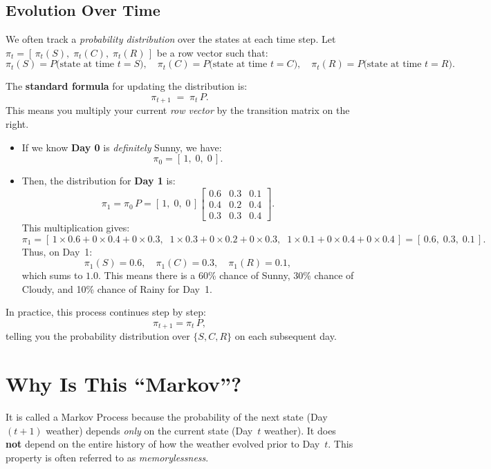 \subsection{Evolution Over Time}

We often track a \textit{probability distribution} over the states at each time step. 
Let \(\pi_t = [\, \pi_t(S),\; \pi_t(C),\; \pi_t(R) \,]\) be a row vector such that:
\[
\pi_t(S) = P\bigl(\text{state at time }t = S\bigr), \quad
\pi_t(C) = P\bigl(\text{state at time }t = C\bigr), \quad
\pi_t(R) = P\bigl(\text{state at time }t = R\bigr).
\]

The \textbf{standard formula} for updating the distribution is:
\[
\pi_{t+1} 
\;=\; 
\pi_t \, P.
\]
This means you multiply your current \textit{row vector} by the transition matrix on the right.

\begin{itemize}
  \item If we know \textbf{Day 0} is \textit{definitely} Sunny, we have:
  \[
    \pi_0 = [\, 1,\; 0,\; 0 \,].
  \]

  \item Then, the distribution for \textbf{Day 1} is:
  \[
    \pi_1 
    = \pi_0 \, P
    = [\, 1,\; 0,\; 0 \,]
      \begin{bmatrix}
      0.6 & 0.3 & 0.1 \\
      0.4 & 0.2 & 0.4 \\
      0.3 & 0.3 & 0.4
      \end{bmatrix}.
  \]
  This multiplication gives:
  \[
    \pi_1 
    = [\, 1 \times 0.6 + 0 \times 0.4 + 0 \times 0.3,\;\;
         1 \times 0.3 + 0 \times 0.2 + 0 \times 0.3,\;\;
         1 \times 0.1 + 0 \times 0.4 + 0 \times 0.4 \,]
    = [\, 0.6,\; 0.3,\; 0.1 \,].
  \]
  Thus, on Day~1:
  \[
    \pi_1(S) = 0.6, \quad \pi_1(C) = 0.3, \quad \pi_1(R) = 0.1,
  \]
  which sums to \(1.0\). This means there is a 60\% chance of Sunny, 30\% chance of Cloudy, and 10\% chance of Rainy for Day~1.
\end{itemize}

In practice, this process continues step by step:
\[
\pi_{t+1} = \pi_t \, P, 
\]
telling you the probability distribution over \(\{S, C, R\}\) on each subsequent day.

\section{Why Is This ``Markov''?}
It is called a Markov Process because the probability of the next state (Day~\((t+1)\) weather) depends \textit{only} on the current state (Day~\(t\) weather). It does \textbf{not} depend on the entire history of how the weather evolved prior to Day~\(t\). This property is often referred to as \textit{memorylessness}.

